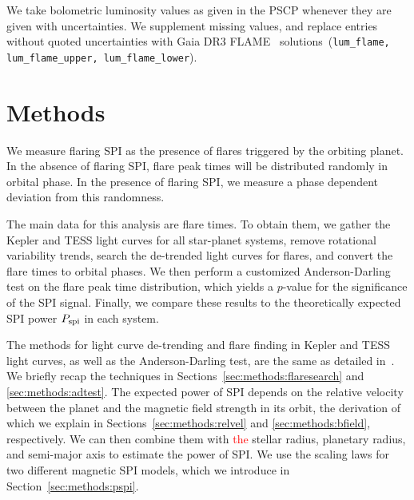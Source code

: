 \documentclass[twocolumn]{aastex631}
\begin{document}
We take bolometric luminosity values as given in the PSCP whenever they are given with uncertainties. We supplement missing values, and replace entries without quoted uncertainties with Gaia DR3 FLAME~\citep{fouesneau2022gaia} solutions~(\texttt{lum\_flame, lum\_flame\_upper, lum\_flame\_lower}). 

\section{Methods}
\label{sec:methods}
We measure flaring SPI as the presence of flares triggered by the orbiting planet. In the absence of flaring SPI, flare peak times will be distributed randomly in orbital phase. In the presence of flaring SPI, we measure a phase dependent deviation from this randomness.

The main data for this analysis are flare times. To obtain them, we gather the Kepler and TESS light curves for all star-planet systems, remove rotational variability trends, search the de-trended light curves for flares, and convert the flare times to orbital phases. We then perform a customized Anderson-Darling test on the flare peak time distribution, which yields a $p$-value for the significance of the SPI signal. Finally, we compare these results to the theoretically expected SPI power $P_{\rm spi}$ in each system.

The methods for light curve de-trending and flare finding in Kepler and TESS light curves, as well as the Anderson-Darling test, are the same as detailed in~\citet{ilin2022searching}. We briefly recap the techniques in Sections~\ref{sec:methods:flaresearch} and \ref{sec:methods:adtest}. The expected power of SPI depends on the relative velocity between the planet and the magnetic field strength in its orbit, the derivation of which we explain in 
Sections~\ref{sec:methods:relvel} and \ref{sec:methods:bfield}, respectively. We can then combine them with \textcolor{red}{the} stellar radius, planetary radius, and semi-major axis to estimate the power of SPI. We use the scaling laws for two different magnetic SPI models, which we introduce in Section~\ref{sec:methods:pspi}.
\end{document}
